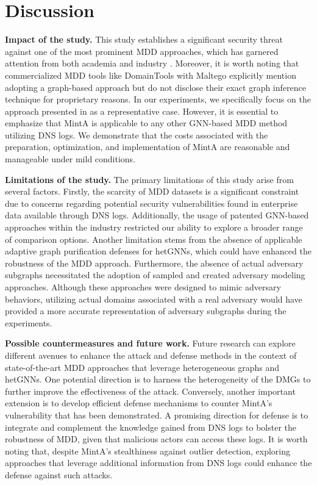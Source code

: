 \documentclass[conference,compsoc]{IEEEtran}
\begin{document}
\section{Discussion}
\label{Section7}
\par \textbf{Impact of the study.} This study establishes a significant security threat against one of the most prominent MDD approaches, which has garnered attention from both academia \cite{sun2019hindom,li2021dydom,li2022heterogeneous,sun2020deepdom,zhang2021attributed} and industry \cite{nabeel2022brand,khalil2020method,nabeel2021method,tirumala2022scoring}. Moreover, it is worth noting that commercialized MDD tools like DomainTools with Maltego \cite{domaintools-maltego} explicitly mention adopting a graph-based approach but do not disclose their exact graph inference technique for proprietary reasons. In our experiments, we specifically focus on the approach presented in \cite{sun2020deepdom} as a representative case. However, it is essential to emphasize that MintA is applicable to any other GNN-based MDD method utilizing DNS logs. We demonstrate that the costs associated with the preparation, optimization, and implementation of MintA are reasonable and manageable under mild conditions. 

\par \textbf{Limitations of the study.} The primary limitations of this study arise from several factors. Firstly, the scarcity of MDD datasets is a significant constraint due to concerns regarding potential security vulnerabilities found in enterprise data available through DNS logs. Additionally, the usage of patented GNN-based approaches within the industry restricted our ability to explore a broader range of comparison options.
Another limitation stems from the absence of applicable adaptive graph purification defenses for hetGNNs, which could have enhanced the robustness of the MDD approach. Furthermore, the absence of actual adversary subgraphs necessitated the adoption of sampled and created adversary modeling approaches. Although these approaches were designed to mimic adversary behaviors, utilizing actual domains associated with a real adversary would have provided a more accurate representation of adversary subgraphs during the experiments.

\par \textbf{Possible countermeasures and future work.} Future research can explore different avenues to enhance the attack and defense methods in the context of state-of-the-art MDD approaches that leverage heterogeneous graphs and hetGNNs. One potential direction is to harness the heterogeneity of the DMGs to further improve the effectiveness of the attack.
Conversely, another important extension is to develop efficient defense mechanisms to counter MintA's vulnerability that has been demonstrated. A promising direction for defense is to integrate and complement the knowledge gained from DNS logs to bolster the robustness of MDD, given that malicious actors can access these logs. It is worth noting that, despite MintA's stealthiness against outlier detection, exploring approaches that leverage additional information from DNS logs could enhance the defense against such attacks.
\end{document}
